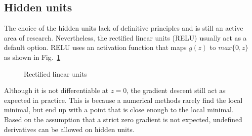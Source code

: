 \subsection{Hidden units}
The choice of the hidden units lack of definitive principles and is still an active area of research.
Nevertheless, the rectified linear units (RELU) usually act as a default option.
RELU uses an activation function that maps $g(z)$ to $max\{0,z\}$ as shown in Fig.~\ref{lr_fig:ml_relu}
\begin{figure}[!ht]
    \centering
    \caption{Rectified linear units}
    \label{lr_fig:ml_relu}
\end{figure}
%
Although it is not differentiable at $z=0$, the gradient descent still act as expected in practice.
This is because a numerical methods rarely find the local minimal, but end up with a point that is close enough to the local minimal.
Based on the assumption that a strict zero gradient is not expected, undefined derivatives can be allowed on hidden units.

